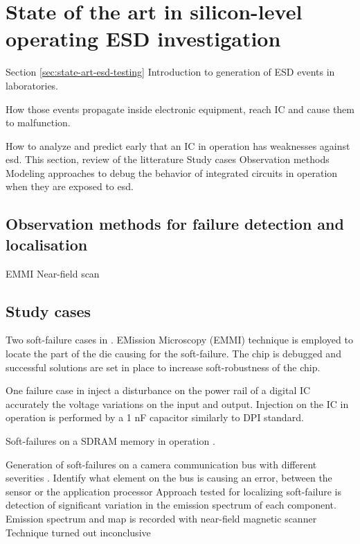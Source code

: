 \section{State of the art in silicon-level operating ESD investigation}

Section \ref{sec:state-art-esd-testing}
Introduction to generation of ESD events in laboratories.

How those events propagate inside electronic equipment, reach \gls{IC} and cause them to malfunction.

How to analyze and predict early that an \gls{IC} in operation has weaknesses against \gls{esd}.
This section, review of the litterature
Study cases
Observation methods
Modeling approaches to debug the behavior of integrated circuits in operation when they are exposed to \gls{esd}.

\subsection{Observation methods for failure detection and localisation}

EMMI
Near-field scan

\subsection{Study cases}

Two soft-failure cases in \cite{systemLevelESDIC}.
EMission Microscopy (EMMI) technique is employed to locate the part of the die causing for the soft-failure.
The chip is debugged and successful solutions are set in place to increase soft-robustness of the chip.

One failure case in \cite{LacrampeTransientImmunity}
inject a disturbance on the power rail of a digital IC
accurately the voltage variations on the input and output.
Injection on the IC in operation is performed by a 1 nF capacitor similarly to DPI standard.

Soft-failures on a SDRAM memory in operation \cite{SDRAMCase}.

Generation of soft-failures on a camera communication bus with different severities \cite{softFailSubsystem}.
Identify what element on the bus is causing an error, between the sensor or the application processor
Approach tested for localizing soft-failure is detection of significant variation in the emission spectrum of each component.
Emission spectrum and map is recorded with near-field magnetic scanner
Technique turned out inconclusive

